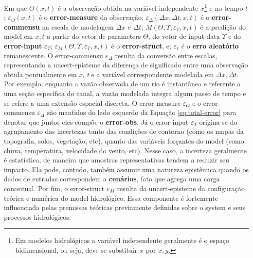 \documentclass[./main.tex]{subfiles}
\begin{document}
Em que $O(x, t)$ é a observação obtida na variável independente $x$\footnote{Em modelos hidrológicos a variável independente geralmente é o espaço bidimensional, ou seja, deve-se substituir $x$ por $x, y$.} e no tempo $t$; $\varepsilon_{O}(x, t)$ é o \textbf{\gls{error-measure}} da observação; $\varepsilon_{\Delta}(\Delta x,\Delta t, x, t)$ é o\textbf{ \gls{error-commensu}} na escala de modelagem $\Delta x$ e $\Delta t$; $M(\Theta, \Upsilon, \varepsilon_{\Upsilon}, x, t)$ é a predição do \gls{model} em $x, t$ a partir do vetor de \gls{parameters} $\Theta$, do vetor de \gls{input-data} $\Upsilon$ e do \textbf{\gls{error-input}} $\varepsilon_{\Upsilon}$; $\varepsilon_{M}(\Theta, \Upsilon, \varepsilon_{\Upsilon}, x, t)$ é o \textbf{\gls{error-struct}}, e; $\varepsilon_r$ é o \textbf{erro aleatório} remanescente. O \gls{error-commensu} $\varepsilon_{\Delta}$ resulta da conversão entre escalas, representando a \gls{uncert-episteme} da diferença de significado entre uma observação obtida pontualmente em \textit{x, t} e a variável correspondente modelada em $\Delta x, \Delta t$. Por exemplo, enquanto a vazão observada de um rio é instantânea e referente a uma seção específica do canal, a vazão modelada integra algum passo de tempo e se refere a uma extensão espacial discreta. O \gls{error-measure} $\varepsilon_{O}$ e o \gls{error-commensu} $\varepsilon_{\Delta}$ são mantidos do lado esquerdo da Equação \eqref{eq:total-error} para denotar que juntos eles compõe o \textbf{\gls{error-obs}}. Já o \gls{error-input} $\varepsilon_\Upsilon$ origina-se do agrupamento das incertezas tanto das condições de contorno (como os mapas da topografia, solos, vegetação, etc), quanto das variáveis forçantes do \gls{model} (como chuva, temperatura, velocidade do vento, etc). Nesse caso, a incerteza geralmente é estatística, de maneira que amostras representativas tendem a reduzir seu impacto. Ela pode, contudo, também assumir uma natureza epistêmica quando os dados de entradas correspondem a \textbf{cenários}, fato que agrega uma carga conceitual. Por fim, o \gls{error-struct} $\varepsilon_M$ resulta da \gls{uncert-episteme} da configuração teórica e numérica do \gls{model} hidrológico. Essa componente é fortemente influenciada pelas premissas teóricas previamente definidas sobre o \gls{system} e seus processos hidrológicos.
\end{document}
